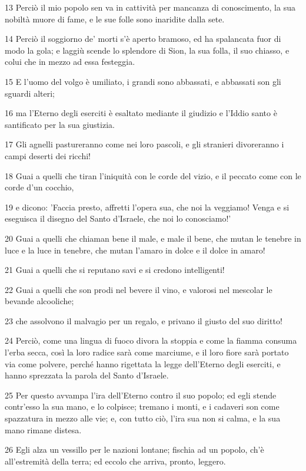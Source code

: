 \par 13 Perciò il mio popolo sen va in cattività per mancanza di conoscimento, la sua nobiltà muore di fame, e le sue folle sono inaridite dalla sete.
\par 14 Perciò il soggiorno de' morti s'è aperto bramoso, ed ha spalancata fuor di modo la gola; e laggiù scende lo splendore di Sion, la sua folla, il suo chiasso, e colui che in mezzo ad essa festeggia.
\par 15 E l'uomo del volgo è umiliato, i grandi sono abbassati, e abbassati son gli sguardi alteri;
\par 16 ma l'Eterno degli eserciti è esaltato mediante il giudizio e l'Iddio santo è santificato per la sua giustizia.
\par 17 Gli agnelli pastureranno come nei loro pascoli, e gli stranieri divoreranno i campi deserti dei ricchi!
\par 18 Guai a quelli che tiran l'iniquità con le corde del vizio, e il peccato come con le corde d'un cocchio,
\par 19 e dicono: 'Faccia presto, affretti l'opera sua, che noi la veggiamo! Venga e si eseguisca il disegno del Santo d'Israele, che noi lo conosciamo!'
\par 20 Guai a quelli che chiaman bene il male, e male il bene, che mutan le tenebre in luce e la luce in tenebre, che mutan l'amaro in dolce e il dolce in amaro!
\par 21 Guai a quelli che si reputano savi e si credono intelligenti!
\par 22 Guai a quelli che son prodi nel bevere il vino, e valorosi nel mescolar le bevande alcooliche;
\par 23 che assolvono il malvagio per un regalo, e privano il giusto del suo diritto!
\par 24 Perciò, come una lingua di fuoco divora la stoppia e come la fiamma consuma l'erba secca, così la loro radice sarà come marciume, e il loro fiore sarà portato via come polvere, perché hanno rigettata la legge dell'Eterno degli eserciti, e hanno sprezzata la parola del Santo d'Israele.
\par 25 Per questo avvampa l'ira dell'Eterno contro il suo popolo; ed egli stende contr'esso la sua mano, e lo colpisce; tremano i monti, e i cadaveri son come spazzatura in mezzo alle vie; e, con tutto ciò, l'ira sua non si calma, e la sua mano rimane distesa.
\par 26 Egli alza un vessillo per le nazioni lontane; fischia ad un popolo, ch'è all'estremità della terra; ed eccolo che arriva, pronto, leggero.
